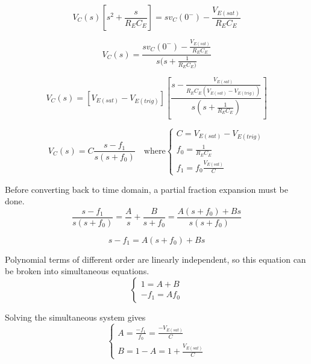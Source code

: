 \documentclass[titlepage, letterpaper, 10.5pt]{article}
\begin{document}
\begin{equation*}
V_{C}(s)\left[s^{2}+\frac{s}{R_{E}C_{E}}\right]=
sv_{C}(0^{-})-\frac{V_{E(sat)}}{R_{E}C_{E}}
\end{equation*}

\begin{equation*}
V_{C}(s)=\frac{sv_{C}(0^{-})-\frac{V_{E(sat)}}{R_{E}C_{E}}}
{s(s+\frac{1}{R_{E}C_{E})}}
\end{equation*}

\begin{equation*}
V_{C}(s)=[V_{E(sat)}-V_{E(trig)}]\left[
\frac{s-\frac{V_{E(sat)}}{R_{E}C_{E}(V_{E(sat)}-V_{E(trig)})}}
{s(s+\frac{1}{R_{E}C_{E}})}\right]
\end{equation*}

\begin{equation}
V_{C}(s)=C\frac{s-f_{1}}{s(s+f_{0})}\quad\textrm{where}
	\left\{
	\begin{array}{lr}
	C=V_{E(sat)}-V_{E(trig)}	\\
	f_{0}=\frac{1}{R_{E}C_{E}}	\\
	f_{1}=f_{0}\frac{V_{E(sat)}}{C}
	\end{array}
	\right.
\label{transfer-parameters}
\end{equation}

Before converting back to time domain, a partial fraction expansion must be done.
\begin{equation*}
\frac{s-f_{1}}{s(s+f_{0})}=\frac{A}{s}+\frac{B}{s+f_{0}}=\frac{A(s+f_{0})+Bs}{s(s+f_{0})}
\end{equation*}

\begin{equation*}
s-f_{1}=A(s+f_{0})+Bs
\end{equation*}

Polynomial terms of different order are linearly independent, so this equation can be broken
into simultaneous equations.
\begin{equation*}
	\left\{
	\begin{array}{lr}
	1=A+B	\\
	-f_{1}=Af_{0}
	\end{array}
	\right.
\end{equation*}

Solving the simultaneous system gives
\begin{equation}
	\left\{
	\begin{array}{lr}
	A=\frac{-f_{1}}{f_{0}}=\frac{-V_{E(sat)}}{C}	\\
	B=1-A=1+\frac{V_{E(sat)}}{C}
	\end{array}
	\right.
\label{partial-fraction-coefficients}
\end{equation}
\end{document}
